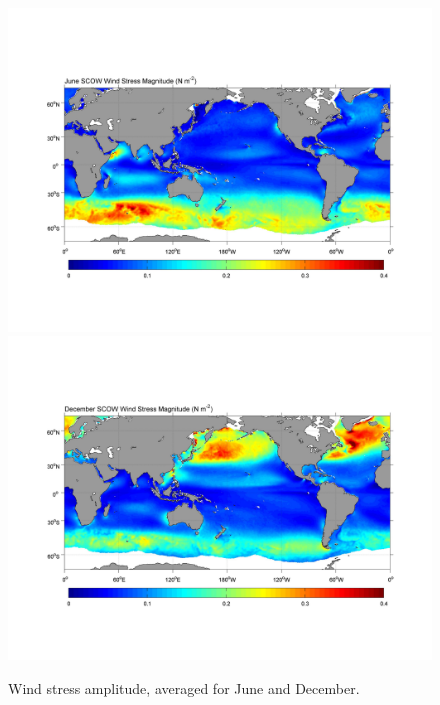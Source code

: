 \begin{figure}[hbt]
  \begin{center}
    \includegraphics[trim=50 140 50 120,clip]{figs/Coriolis/June_SCOW_Wind_Stress_Magnitude-crop}
    \includegraphics[trim=50 90 50 120,clip]{figs/Coriolis/December_SCOW_Wind_Stress_Magnitude-crop}
  \caption{Wind stress amplitude, averaged for June and December.}
    \label{fig:Windstresses}  
  \end{center}
\end{figure}



